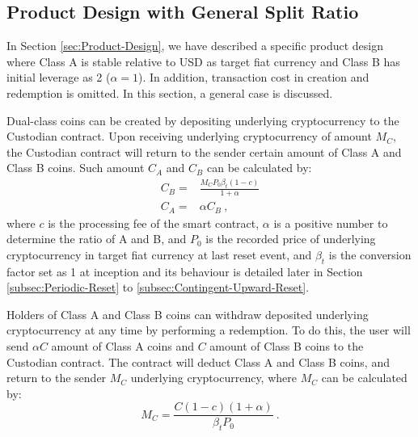 \documentclass[draft, noinfoline]{ectaart}
\numberwithin{equation}{section}
\theoremstyle{plain}
\begin{document}
\begin{appendices}

\section{Product Design with General Split Ratio}\label{subsec:General-Product-Design}


In Section \ref{sec:Product-Design}, we have described a specific product design where Class A is stable relative to USD as target fiat currency and Class B has initial leverage as 2 ($\alpha=1$). In addition, transaction cost in creation and redemption is omitted. In this section, a general case is discussed.


Dual-class coins can be created by depositing underlying cryptocurrency to the Custodian contract. Upon receiving underlying cryptocurrency of amount $M_{C}$, the Custodian contract will return to the sender certain amount of Class A and Class B coins. Such amount $C_{A}$ and $C_{B}$ can be calculated by:
\begin{equation}
\begin{array}{ll}
C_{B}= & \frac{M_{C} P_{0}\beta_t\left(1-c\right)}{1+\alpha}\\
C_{A}= & \alpha C_{B}\ ,
\end{array}\label{eq:creation-1}
\end{equation}
where $c$ is the processing fee of the smart contract, $\alpha$ is a positive number to determine the ratio of A and B, and $P_{0}$ is the recorded price of underlying cryptocurrency in target fiat currency at last reset event, and $\beta_t$ is the conversion factor set as 1 at inception and its behaviour is detailed later in Section \ref{subsec:Periodic-Reset} to \ref{subsec:Contingent-Upward-Reset}.


Holders of Class A and Class B coins can withdraw deposited underlying cryptocurrency at any time by performing a redemption. To do this, the user will send $\alpha C$ amount of Class A coins and $C$ amount of Class B coins to the Custodian contract. The contract will deduct Class A and Class B coins, and return to the sender $M_{C}$ underlying cryptocurrency, where $M_{C}$ can be calculated by:
\begin{equation}
M_{C}=\frac{C \left(1-c\right) \left(1+\alpha\right)}{\beta_t P_{0}}\ .\label{eq:redemption-1}
\end{equation}


\end{appendices}
\end{document}
